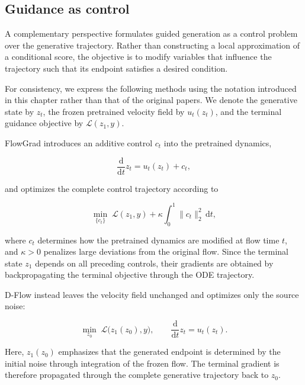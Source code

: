 \subsection{Guidance as control}
\label{sec:guidance-as-control}

A complementary perspective formulates guided generation as a control problem
over the generative trajectory.
Rather than constructing a local approximation of a conditional score, the
objective is to modify variables that influence the trajectory such that its
endpoint satisfies a desired condition.

For consistency, we express the following methods using the notation introduced
in this chapter rather than that of the original papers.
We denote the generative state by $z_t$, the frozen pretrained velocity field
by $u_t(z_t)$, and the terminal guidance objective by
$\mathcal{L}(z_1,y)$.

FlowGrad \parencite{liu2023flowgrad} introduces an additive control
$c_t$ into the pretrained dynamics,

\begin{equation}
    \frac{\mathrm{d}}{\mathrm{d}t}z_t
    =
    u_t(z_t)+c_t,
    \label{eq:flowgrad-dynamics}
\end{equation}

and optimizes the complete control trajectory according to

\begin{equation}
    \min_{\{c_t\}}
    \;
    \mathcal{L}(z_1,y)
    +
    \kappa
    \int_0^1
    \lVert c_t\rVert_2^2
    \,\mathrm{d}t,
    \label{eq:flowgrad-control}
\end{equation}

where $c_t$ determines how the pretrained dynamics are modified at flow time
$t$, and $\kappa>0$ penalizes large deviations from the original flow.
Since the terminal state $z_1$ depends on all preceding controls, their
gradients are obtained by backpropagating the terminal objective through the
ODE trajectory.

D-Flow \parencite{benhamu2024dflow} instead leaves the velocity field unchanged
and optimizes only the source noise:

\begin{equation}
    \min_{z_0}
    \;
    \mathcal{L}\bigl(z_1(z_0),y\bigr),
    \qquad
    \frac{\mathrm{d}}{\mathrm{d}t}z_t
    =
    u_t(z_t).
    \label{eq:dflow-control}
\end{equation}

Here, $z_1(z_0)$ emphasizes that the generated endpoint is determined by the
initial noise through integration of the frozen flow.
The terminal gradient is therefore propagated through the complete generative
trajectory back to $z_0$.

